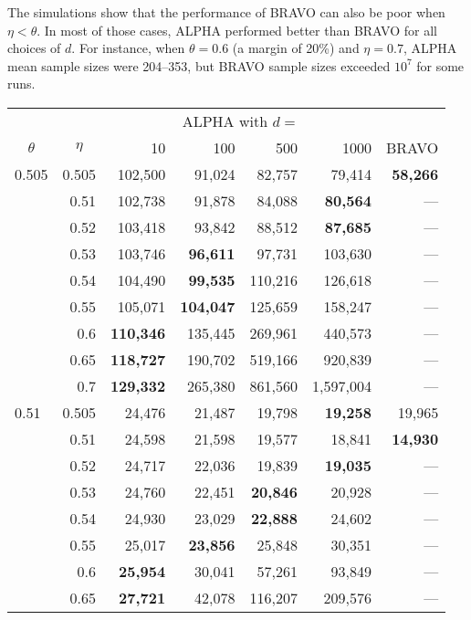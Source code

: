 \documentclass[12pt,runningheads]{llncs}
\begin{document}
{The simulations show that the performance of BRAVO can also be poor when $\eta < \theta$.
In most of those cases, ALPHA performed better than BRAVO for all choices of $d$.
For instance, when $\theta=0.6$ (a margin of 20\%) and $\eta=0.7$,  ALPHA mean sample sizes were 204--353, but BRAVO sample sizes
exceeded $10^7$ for some runs.

\begin{table}
\centering
\tiny
\begin{tabular}{lr|rrrr|r}
  \multicolumn{2}{c|}{}    & \multicolumn{4}{|c|}{ALPHA with $d=$} & \multicolumn{1}{c}{} \\ 
\multicolumn{1}{c}{$\theta$}     &  \multicolumn{1}{c|}{$\eta$}   &  10 & 100 & 500 & 1000 & \multicolumn{1}{c}{BRAVO} \\
\hline
0.505 & 0.505 & 102,500 & 91,024 & 82,757 & 79,414 & \bf{58,266} \\
      & 0.51 & 102,738 & 91,878 & 84,088 & \bf{80,564} & --- \\
      & 0.52 & 103,418 & 93,842 & 88,512 & \bf{87,685} & --- \\
      & 0.53 & 103,746 & \bf{96,611} & 97,731 & 103,630 & --- \\
      & 0.54 & 104,490 & \bf{99,535} & 110,216 & 126,618 & --- \\
      & 0.55 & 105,071 & \bf{104,047} & 125,659 & 158,247 & --- \\
      & 0.6 & \bf{110,346} & 135,445 & 269,961 & 440,573 & --- \\
      & 0.65 & \bf{118,727} & 190,702 & 519,166 & 920,839 & --- \\
      & 0.7 & \bf{129,332} & 265,380 & 861,560 & 1,597,004 & --- \\
\hline
0.51 & 0.505 & 24,476 & 21,487 & 19,798 & \bf{19,258} & 19,965 \\
     & 0.51 & 24,598 & 21,598 & 19,577 & 18,841 & \bf{14,930} \\
     & 0.52 & 24,717 & 22,036 & 19,839 & \bf{19,035} & --- \\
     & 0.53 & 24,760 & 22,451 & \bf{20,846} & 20,928 & --- \\
     & 0.54 & 24,930 & 23,029 & \bf{22,888} & 24,602 & --- \\
     & 0.55 & 25,017 & \bf{23,856} & 25,848 & 30,351 & --- \\
     & 0.6 & \bf{25,954} & 30,041 & 57,261 & 93,849 & --- \\
     & 0.65 & \bf{27,721} & 42,078 & 116,207 & 209,576 & --- \\

\end{tabular}
\end{table}}
\end{document}
